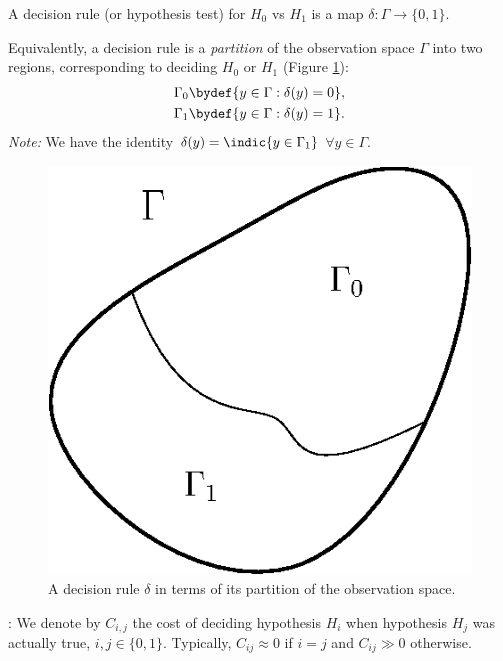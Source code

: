 \documentclass[12pt]{report}
\begin{document}
\begin{defn}
A decision rule (or hypothesis test) for $H_0$ vs $H_1$ is a map $\delta: \Gamma \to \{0, 1\}$.
\end{defn}

Equivalently, a decision rule is a {\em partition} of the observation space $\Gamma$ into two regions, corresponding to deciding $H_0$ or $H_1$ (Figure \ref{fig:decrule}):
\begin{align*}
\Gamma_0 &\bydef \{y \in \Gamma: \delta(y) = 0\}, \\
\Gamma_1 &\bydef \{y \in \Gamma: \delta(y) = 1\}. 
\end{align*}
{\em Note:} We have the identity $\delta(y) = \indic{y \in \Gamma_1}$ $\forall y \in \Gamma$. \\

\begin{figure}[htbp]
\begin{center}
\includegraphics[scale = 0.8]{Figures/Gamma.eps}
\caption{A decision rule $\delta$ in terms of its partition of the observation space.}
\label{fig:decrule}
\end{center}
\end{figure}

: We denote by $C_{i,j}$ the cost of deciding hypothesis $H_i$ when hypothesis $H_j$ was actually true, $i, j \in \{0,1\}$. Typically, $C_{ij} \approx 0$ if $i = j$ and $C_{ij} \gg 0$ otherwise.
\end{document}
